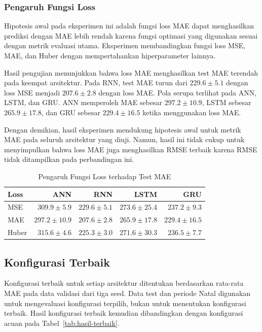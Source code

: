 \documentclass[conference,a4paper]{IEEEtran}
\begin{document}
\subsubsection{Pengaruh Fungsi Loss}

Hipotesis awal pada eksperimen ini adalah fungsi loss MAE
dapat menghasilkan prediksi dengan MAE lebih rendah karena
fungsi optimasi yang digunakan sesuai dengan metrik evaluasi
utama. Eksperimen membandingkan fungsi loss MSE, MAE, dan
Huber dengan mempertahankan hiperparameter lainnya.

Hasil pengujian menunjukkan bahwa loss MAE menghasilkan
test MAE terendah pada keempat arsitektur. Pada RNN, test
MAE turun dari $229.6 \pm 5.1$ dengan loss MSE menjadi
$207.6 \pm 2.8$ dengan loss MAE. Pola serupa terlihat pada
ANN, LSTM, dan GRU. ANN memperoleh MAE sebesar
$297.2 \pm 10.9$, LSTM sebesar $265.9 \pm 17.8$, dan
GRU sebesar $229.4 \pm 16.5$ ketika menggunakan loss MAE.

Dengan demikian, hasil eksperimen mendukung hipotesis awal
untuk metrik MAE pada seluruh arsitektur yang diuji.
Namun, hasil ini tidak cukup untuk menyimpulkan bahwa loss
MAE juga menghasilkan RMSE terbaik karena RMSE tidak
ditampilkan pada perbandingan ini.

\begin{table}[!t]
    \centering
    \caption{Pengaruh Fungsi Loss terhadap Test MAE}
    \label{tab:ablasi-loss}
    \footnotesize
    \begin{tabular}{lrrrr}
        \toprule
        Loss & ANN & RNN & LSTM & GRU \\
        \midrule
        MSE
        & $309.9 \pm 5.9$
        & $229.6 \pm 5.1$
        & $273.6 \pm 25.4$
        & $237.2 \pm 9.3$ \\
        MAE
        & $297.2 \pm 10.9$
        & $207.6 \pm 2.8$
        & $265.9 \pm 17.8$
        & $229.4 \pm 16.5$ \\
        Huber
        & $315.6 \pm 4.6$
        & $225.3 \pm 3.0$
        & $271.6 \pm 30.3$
        & $236.5 \pm 7.7$ \\
        \bottomrule
    \end{tabular}
\end{table}


\subsection{Konfigurasi Terbaik}

Konfigurasi terbaik untuk setiap arsitektur ditentukan
berdasarkan rata-rata MAE pada data validasi dari tiga seed.
Data test dan periode Natal digunakan untuk mengevaluasi
konfigurasi terpilih, bukan untuk menentukan konfigurasi
terbaik. Hasil konfigurasi terbaik kemudian dibandingkan
dengan konfigurasi acuan pada Tabel~\ref{tab:hasil-terbaik}.
\end{document}
